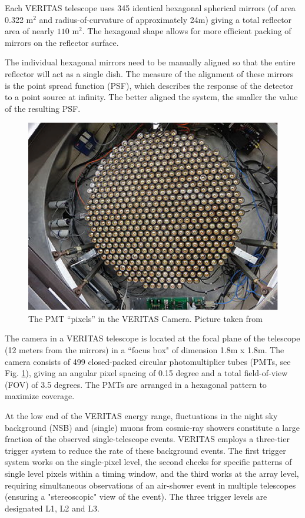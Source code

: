 \documentclass[main.tex]{subfiles}
\begin{document}
Each VERITAS telescope uses 345 identical hexagonal spherical mirrors (of area 0.322 m$^2$ and radius-of-curvature of approximately 24m) giving a total reflector area of nearly $110$ m$^2$. The hexagonal shape allows for more efficient packing of mirrors on the reflector surface.\par
The individual hexagonal mirrors need to be manually aligned so that the entire reflector will act as a single dish. The measure of the alignment of these mirrors is the point spread function (PSF), which describes the response of the detector to a point source at infinity. The better aligned the system, the smaller the value of the resulting PSF.\par
\begin{figure}[htbp]
  \centering
  \includegraphics[width=0.58\linewidth]{images/Camera_PMT}
  \caption[PMTs in the VERITAS camera.]{The PMT ``pixels'' in the VERITAS Camera. Picture taken from \cite{Kieda:2013wom}}
  \label{fig:VERITAS_Cam}
\end{figure}
The camera in a VERITAS telescope is located at the focal plane of the telescope (12 meters from the mirrors) in a ``focus box" of dimension 1.8m x 1.8m. The camera consists of 499 closed-packed circular photomultiplier tubes (PMTs, see Fig. \ref{fig:VERITAS_Cam}), giving an angular pixel spacing of 0.15 degree and a total field-of-view (FOV) of 3.5 degrees. The PMTs are arranged in a hexagonal pattern to maximize coverage.\par

At the low end of the VERITAS energy range, fluctuations in the night sky background (NSB) and (single) muons from cosmic-ray showers constitute a large fraction of the observed single-telescope events. VERITAS employs a three-tier trigger system to reduce the rate of these background events. The first trigger system works on the single-pixel level, the second checks for specific patterns of single level pixels within a timing window, and the third works at the array level, requiring simultaneous observations of an air-shower event in multiple telescopes (ensuring a "stereoscopic" view of the event). The three trigger levels are designated L1, L2 and L3.\par
\end{document}
